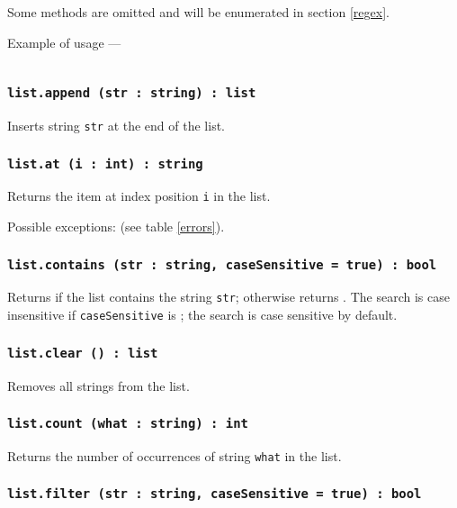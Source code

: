 Some methods are omitted and will be enumerated in section \ref{regex}.

Example of usage —
\inputminted[linenos]{icl}{../sources/listmethods.icL}

\subsubsection{\texttt{list.append (str : string) : list}}

Inserts string \texttt{str} at the end of the list.

\subsubsection{\texttt{list.at (i : int) : string}}

Returns the item at index position \texttt{i} in the list.

Possible exceptions:  (see table \ref{errors}).

\subsubsection{\texttt{list.contains (str : string, caseSensitive = true) : bool}}

Returns \true{} if the list contains the string \texttt{str}; otherwise returns \false. The search is case insensitive if \texttt{caseSensitive} is \true; the search is case sensitive by default.

\subsubsection{\texttt{list.clear () : list}}

Removes all strings from the list.

\subsubsection{\texttt{list.count (what : string) : int}}

Returns the number of occurrences of string \texttt{what} in the list.

\subsubsection{\texttt{list.filter (str : string, caseSensitive = true) : bool}}

